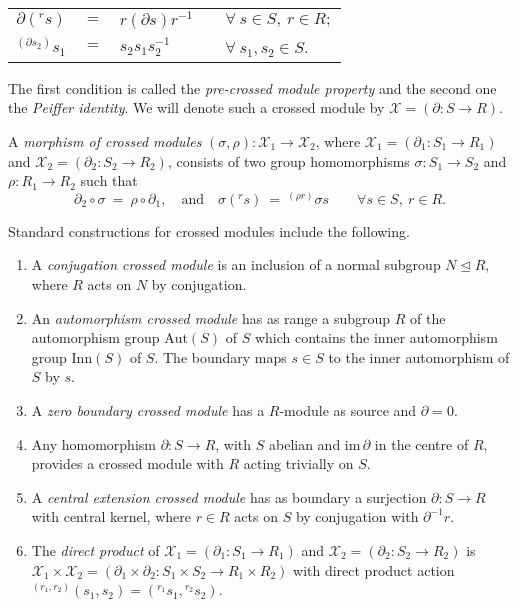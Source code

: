 \documentclass{ws-ijac}
\newcommand{\calX}{\mathcal{X}}
\newcommand{\Aut}   {\mathrm{Aut}}
\newcommand{\im}    {\mathrm{im}\,}
\newcommand{\Inn}   {\mathrm{Inn}}
\begin{document}
\begin{center}
	\begin{tabular}{rclll}
	$\partial (^{r}s)$ 
		& $=$ 
			& $r(\partial s)r^{-1}$ 
				&   & $\forall~ s \in S,~ r \in R; $ \\
	$^{(\partial s_{2})}s_{1}$ 
		& $=$ 
			& $s_{2}s_{1}s_{2}^{-1}$ 
				&   & $\forall~ s_{1},s_{2} \in S$. 
	\end{tabular}
\end{center}

The first condition is called the \emph{pre-crossed module property} 
and the second one the \emph{Peiffer identity}. 
We will denote such a crossed module by $\calX = (\partial : S \rightarrow R)$.

A \emph{morphism of crossed modules} 
$(\sigma ,\rho ) : \calX_{1} \rightarrow \calX_{2}$, 
where $\calX_{1} = (\partial_{1} : S_{1} \rightarrow R_{1})$ 
and   $\calX_{2} = (\partial_{2} : S_{2} \rightarrow R_{2})$, 
consists of two group homomorphisms $\sigma : S_{1} \rightarrow S_{2}$
and $\rho : R_{1} \rightarrow R_{2}$ such that 
\[ 
\partial_{2}\circ\sigma ~=~ \rho\circ\partial_{1}, 
\quad \mbox{and} \quad 
\sigma(^{r}s) ~=~ ^{(\rho r)}\sigma s 
\qquad
\forall s \in S,~ r \in R.
\] 

Standard constructions for crossed modules include the following. 
\begin{enumerate}
\item 
A \emph{conjugation crossed module}  
is an inclusion of a normal subgroup $N \unlhd R$, 
where $R$ acts on $N$ by conjugation.
\item 
An \emph{automorphism crossed module}  
has as range a subgroup $R$ of the automorphism group $\Aut(S)$ of $S$ 
which contains the inner automorphism group $\Inn(S)$ of $S$. 
The boundary maps $s \in S$ to the inner automorphism of $S$ by $s$.
\item 
A \emph{zero boundary crossed module}  
has a $R$-module as source and $\partial = 0$.
\item 
Any homomorphism $\partial : S \to R$, with $S$ abelian 
and $\im\partial$ in the centre of $R$, 
provides a crossed module with $R$ acting trivially on $S$.
\item 
A \emph{central extension crossed module} 
has as boundary a surjection $\partial : S \to R$ with central kernel, 
where $r \in R$ acts on $S$ by conjugation with $\partial^{-1}r$.
\item 
The \emph{direct product} of  
$\calX_1 = (\partial_1 : S_1 \to R_1)$ and $\calX_2 = (\partial_2 : S_2 \to R_2)$ 
is $\calX_1 \times \calX_2 
= (\partial_1 \times \partial_2 : S_1 \times S_2 \to R_1 \times R_2)$ 
with direct product action 
${}^{(r_1,r_2)}(s_1,s_2) = \left({}^{r_1}s_1,{}^{r_2}s_2\right)$. 
\end{enumerate}
\end{document}

